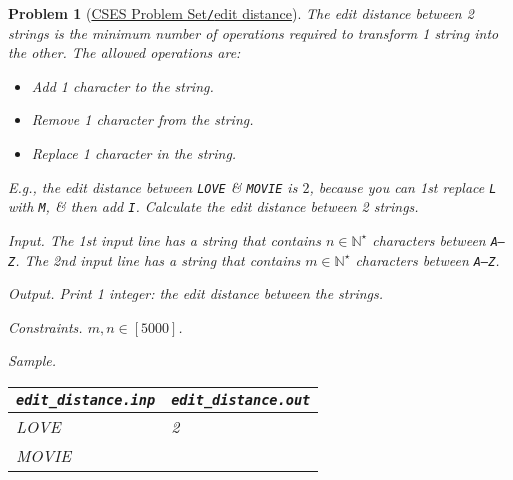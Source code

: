 \documentclass{article}
\newtheorem{problem}{Problem}
\begin{document}
\begin{problem}[\href{https://cses.fi/problemset/task/1639}{CSES Problem Set{\tt/}edit distance}]
	The {\rm edit distance} between 2 strings is the minimum number of operations required to transform 1 string into the other. The allowed operations are:
	\begin{itemize}
		\item Add 1 character to the string.
		\item Remove 1 character from the string.
		\item Replace 1 character in the string.
	\end{itemize}
	E.g., the edit distance between {\tt LOVE} \& {\tt MOVIE} is $2$, because you can 1st replace {\tt L} with {\tt M}, \& then add {\tt I}. Calculate the edit distance between 2 strings.
	\item {\sf Input.} The 1st input line has a string that contains $n\in\mathbb{N}^\star$ characters between {\tt A--Z}. The 2nd input line has a string that contains $m\in\mathbb{N}^\star$ characters between {\tt A--Z}.
	\item {\sf Output.} Print 1 integer: the edit distance between the strings.
	\item {\sf Constraints.} $m,n\in[5000]$.
	\item {\sf Sample.}
	\begin{table}[H]
		\centering
		\begin{tabular}{|l|l|}
			\hline
			\verb|edit_distance.inp| & \verb|edit_distance.out| \\
			\hline
			LOVE & 2 \\
			MOVIE & \\
			\hline
		\end{tabular}
	\end{table}
\end{problem}
\end{document}
